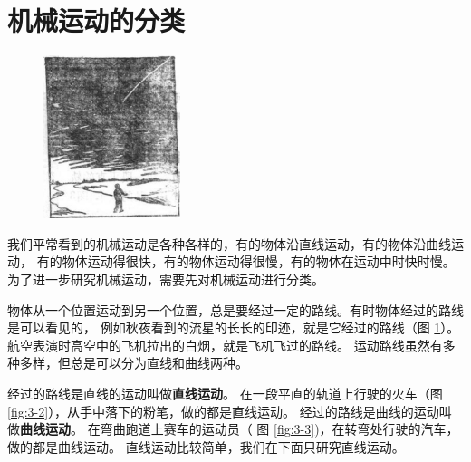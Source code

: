 \section{机械运动的分类}\label{sec:3-2}

\begin{figure}
    \centering
    \includegraphics[width=4cm]{../pic/czwl1-ch3-1}
    \caption{}\label{fig:3-1}
\end{figure}

我们平常看到的机械运动是各种各样的，有的物体沿直线运动，有的物体沿曲线运动，
有的物体运动得很快，有的物体运动得很慢，有的物体在运动中时快时慢。
为了进一步研究机械运动，需要先对机械运动进行分类。

物体从一个位置运动到另一个位置，总是要经过一定的路线。有时物体经过的路线是可以看见的，
例如秋夜看到的流星的长长的印迹，就是它经过的路线（图 \ref{fig:3-1}）。
航空表演时高空中的飞机拉出的白烟，就是飞机飞过的路线。
运动路线虽然有多种多样，但总是可以分为直线和曲线两种。

经过的路线是直线的运动叫做\textbf{直线运动}。
在一段平直的轨道上行驶的火车（图 \ref{fig:3-2}），从手中落下的粉笔，做的都是直线运动。
经过的路线是曲线的运动叫做\textbf{曲线运动}。
在弯曲跑道上赛车的运动员（ 图 \ref{fig:3-3})，在转弯处行驶的汽车，做的都是曲线运动。
直线运动比较简单，我们在下面只研究直线运动。

